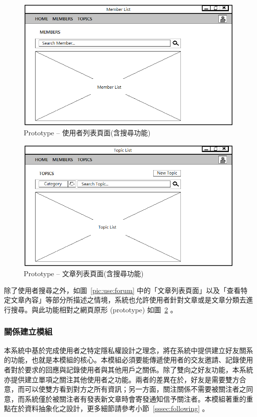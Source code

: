 \begin{figure}[H]
\centering
\includegraphics[width=.7\textwidth]{img/prototype/MemberList.png}
\caption{Prototype -- 使用者列表頁面(含搜尋功能)}
\label{pic:pro:memberList}
\end{figure}

\begin{figure}[H]
\centering
\includegraphics[width=.7\textwidth]{img/prototype/TopicList.png}
\caption{Prototype -- 文章列表頁面(含搜尋功能)}
\label{pic:pro:articleList}
\end{figure}

除了使用者搜尋之外，如圖~\ref{pic:use:forum} 中的「文章列表頁面」以及「查看特定文章內容」等部分所描述之情境，系統也允許使用者針對文章或是文章分類去進行搜尋。與此功能相對之網頁原形 (prototype) 如圖~\ref{pic:pro:articleList} 。

\subsubsection{關係建立模組}

本系統中基於完成使用者之特定隱私權設計之理念，將在系統中提供建立好友關系的功能，也就是本模組的核心。本模組必須要能傳遞使用者的交友邀請、記錄使用者對於要求的回應與記錄使用者與其他用戶之關係。除了雙向之好友功能，本系統亦提供建立單項之關注其他使用者之功能。兩者的差異在於，好友是需要雙方合意，而可以使雙方看到對方之所有資訊；另一方面，關注關係不需要被關注者之同意，而系統僅於被關注者有發表新文章時會寄發通知信予關注者。本模組著重的重點在於資料抽象化之設計，更多細節請參考小節~\ref{sssec:following} 。

